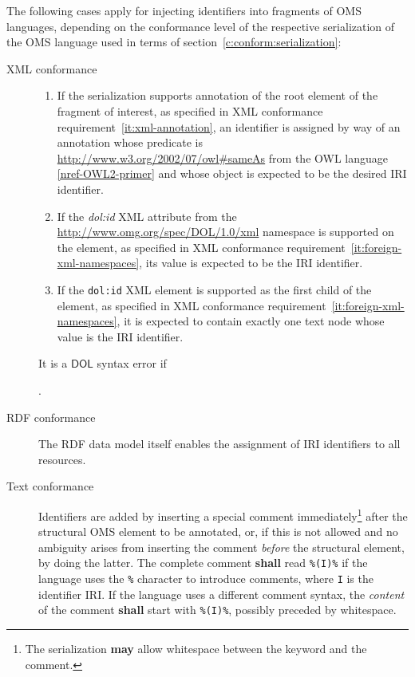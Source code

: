 \documentclass[10pt, a4paper]{isov2}
\newcommand*{\shall}{\textbf{shall}\xspace}
\newcommand*{\may}{\textbf{may}\xspace}
\newcommand*{\DOL}{\ensuremath{\mathsf{DOL}}\xspace}
\renewcommand{\noterefname}{note}
\renewcommand{\nref}[1]{\noterefname~\ref{#1}}
\renewcommand{\nref}[1]{\ref{nref-#1}}
\begin{document}
The following cases apply for injecting identifiers into fragments of OMS languages, depending on the conformance level of the respective serialization of the OMS language used in terms of section~\ref{c:conform:serialization}:
 \begin{description} 
\item[XML conformance]
   \begin{enumerate} 
  \item If the serialization supports annotation of the root element of the fragment of interest, as specified in XML conformance requirement~\ref{it:xml-annotation}, an identifier is assigned by way of an annotation whose predicate is \url{http://www.w3.org/2002/07/owl#sameAs} from the OWL language \nref{OWL2-primer} and whose object is expected to be the desired IRI identifier.
  \item If the \textit{dol:id} XML attribute from the \url{http://www.omg.org/spec/DOL/1.0/xml} namespace is supported on the element, as specified in XML conformance requirement~\ref{it:foreign-xml-namespaces}, its value is expected to be the IRI identifier.
  \item If the \texttt{dol:id} XML element is supported as the first child of the element, as specified in XML conformance requirement~\ref{it:foreign-xml-namespaces}, it is expected to contain exactly one text node whose value is the IRI identifier.
   \end{enumerate} 
  It is a \DOL syntax error if .
\item[RDF conformance] The RDF data model itself enables the assignment of IRI identifiers to all resources.
\item[Text conformance] Identifiers are added by inserting a special comment immediately\footnote{The serialization \may allow whitespace between the keyword and the comment.} after the structural OMS element to be annotated, or, if this is not allowed and no ambiguity arises from inserting the comment \emph{before} the structural element, by doing the latter.  The complete comment \shall read \texttt{\%(I)\%} if the language uses the \texttt{\%} character to introduce comments, where \texttt{I} is the identifier IRI.  If the language uses a different comment syntax, the \emph{content} of the comment \shall start with \texttt{\%(I)\%}, possibly preceded by whitespace.

\end{description}
\end{document}
